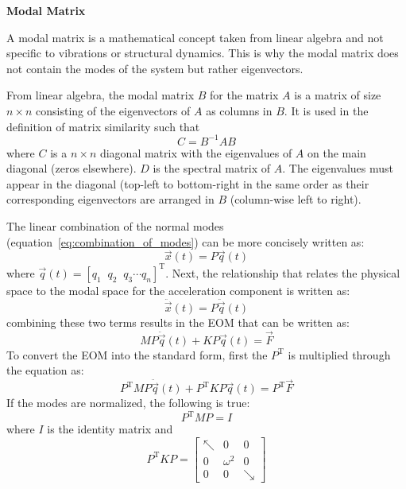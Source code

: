 \documentclass[12pt,letter]{article}
\begin{document}
		\begin{review}	
		\label{review:modal_matirx}
		\textbf{Modal Matrix} 

		\noindent A modal matrix is a mathematical concept taken from linear algebra and not specific to vibrations or structural dynamics. This is why the modal matrix does not contain the modes of the system but rather eigenvectors. 
			
			From linear algebra, the modal matrix $B$ for the matrix $A$ is a matrix of size $n \times n$ consisting of the eigenvectors of $A$ as columns in $B$. It is used in the definition of matrix similarity such that 
			\begin{equation}
			C = B^{-1}AB
			\end{equation}
			where $C$ is a $n \times n$ diagonal matrix with the eigenvalues of $A$ on the main diagonal (zeros elsewhere). $D$ is the spectral matrix of $A$. The eigenvalues must appear in the diagonal (top-left to bottom-right in the same order as their corresponding eigenvectors are arranged in $B$ (column-wise left to right).			
		\end{review}	
	
	
		
	The linear combination of the normal modes (equation~\ref{eq:combination_of_modes}) can be more concisely written as:
	\begin{equation}
	\vec{x}(t) = P\vec{q}(t)
	\end{equation}
	where $\vec{q}(t) = [q_1 \; \; q_2 \; \; q_3 \cdots q_n]^{\text{T}}$. Next, the relationship that relates the physical space to the modal space for the acceleration component is written as:
	\begin{equation}
	\ddot{\vec{x}}(t) = P\ddot{\vec{q}}(t)
	\end{equation}
	combining these two terms results in the EOM that can be written as:
	\begin{equation}
	M P\ddot{\vec{q}}(t) + KP\vec{q}(t) = \vec{F}
	\end{equation}
	To convert the EOM into the standard form, first the $P^{\text{T}}$ is multiplied through the equation as:
	\begin{equation}
	P^{\text{T}} M P\ddot{\vec{q}}(t) + P^{\text{T}} K P\vec{q}(t) = P^{\text{T}} \vec{F}
	\end{equation}
	If the modes are normalized, the following is true: 
	\begin{equation}
	P^{\text{T}} M P = I
	\label{eq:modes_normalized}
	\end{equation}
	where $I$ is the identity matrix and 
	\begin{equation}
	P^{\text{T}} K P = \begin{bmatrix} \nwarrow & 0 & 0 \\  0  & \omega^2 & 0 \\  0  & 0 & \searrow \end{bmatrix}
	\end{equation}
	
\end{document}
